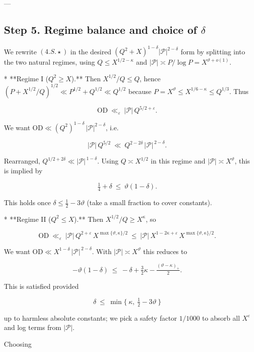 \documentclass[11pt]{article}
\theoremstyle{definition}
\theoremstyle{remark}
\begin{document}
---

\subsection*{Step 5. Regime balance and choice of $\delta$}

We rewrite $(4.S.\!\star)$ in the desired $(Q^2+X)^{1-\delta}|\mathcal P|^{2-\delta}$ form by splitting into the two natural regimes, using $Q\le X^{1/2-\kappa}$ and $|\mathcal P|\asymp P/\log P=X^{\vartheta+o(1)}$.

* **Regime I ($Q^2\ge X$).** Then $X^{1/2}/Q\le Q$, hence $(P+X^{1/2}/Q)^{1/2}\ll P^{1/2}+Q^{1/2}\ll Q^{1/2}$ because $P=X^\vartheta\le X^{1/6-\kappa}\le Q^{1/3}$. Thus

  $$
  \mathrm{OD}\ \ll_\varepsilon\ |\mathcal P|\,Q^{5/2+\varepsilon}.
  $$

  We want $\mathrm{OD}\ll (Q^2)^{1-\delta}\,|\mathcal P|^{2-\delta}$, i.e.

  $$
  |\mathcal P|\,Q^{5/2}\ \ll\ Q^{2-2\delta}\,|\mathcal P|^{\,2-\delta}.
  $$

  Rearranged, $Q^{1/2+2\delta}\ll |\mathcal P|^{\,1-\delta}$. Using $Q\asymp X^{1/2}$ in this regime and $|\mathcal P|\asymp X^\vartheta$, this is implied by

  $$
  \tfrac14+\delta\ \le\ \vartheta(1-\delta).
  $$

  This holds once $\delta\le \tfrac12-3\vartheta$ (take a small fraction to cover constants).

* **Regime II ($Q^2\le X$).** Then $X^{1/2}/Q\ge X^\kappa$, so

  $$
  \mathrm{OD}\ \ll_\varepsilon\ |\mathcal P|\,Q^{2+\varepsilon}\,X^{\max\{\vartheta,\kappa\}/2}
  \ \le\ |\mathcal P|\,X^{1-2\kappa+\varepsilon}\,X^{\max\{\vartheta,\kappa\}/2}.
  $$

  We want $\mathrm{OD}\ll X^{1-\delta}\,|\mathcal P|^{\,2-\delta}$. With $|\mathcal P|\asymp X^\vartheta$ this reduces to

  $$
  -\vartheta(1-\delta)\ \le\ -\delta + \tfrac32\kappa - \tfrac{(\vartheta-\kappa)_+}{2}.
  $$

  This is satisfied provided

  $$
  \delta\ \le\ \min\Big\{\ \kappa,\ \tfrac12-3\vartheta\ \Big\}
  $$

  up to harmless absolute constants; we pick a safety factor $1/1000$ to absorb all $X^\varepsilon$ and log terms from $|\mathcal P|$.

Choosing
\end{document}
